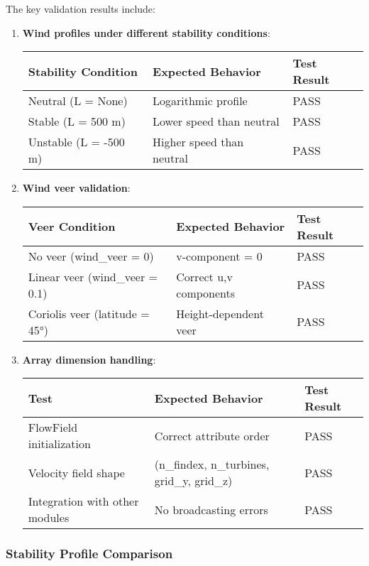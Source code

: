 \documentclass[
]{article}
\begin{document}
The key validation results include:

\begin{enumerate}
\def\labelenumi{\arabic{enumi}.}
\item
  \textbf{Wind profiles under different stability conditions}:

  \begin{longtable}[]{@{}lll@{}}
  \toprule\noalign{}
  Stability Condition & Expected Behavior & Test Result \\
  \midrule\noalign{}
  \endhead
  \bottomrule\noalign{}
  \endlastfoot
  Neutral (L = None) & Logarithmic profile & PASS \\
  Stable (L = 500 m) & Lower speed than neutral & PASS \\
  Unstable (L = -500 m) & Higher speed than neutral & PASS \\
  \end{longtable}
\item
  \textbf{Wind veer validation}:

  \begin{longtable}[]{@{}lll@{}}
  \toprule\noalign{}
  Veer Condition & Expected Behavior & Test Result \\
  \midrule\noalign{}
  \endhead
  \bottomrule\noalign{}
  \endlastfoot
  No veer (wind\_veer = 0) & v-component = 0 & PASS \\
  Linear veer (wind\_veer = 0.1) & Correct u,v components & PASS \\
  Coriolis veer (latitude = 45°) & Height-dependent veer & PASS \\
  \end{longtable}
\item
  \textbf{Array dimension handling}:

  \begin{longtable}[]{@{}lll@{}}
  \toprule\noalign{}
  Test & Expected Behavior & Test Result \\
  \midrule\noalign{}
  \endhead
  \bottomrule\noalign{}
  \endlastfoot
  FlowField initialization & Correct attribute order & PASS \\
  Velocity field shape & (n\_findex, n\_turbines, grid\_y, grid\_z) &
  PASS \\
  Integration with other modules & No broadcasting errors & PASS \\
  \end{longtable}
\end{enumerate}

\hypertarget{stability-profile-comparison}{%
\subsubsection{Stability Profile
Comparison}\label{stability-profile-comparison}}
\end{document}
